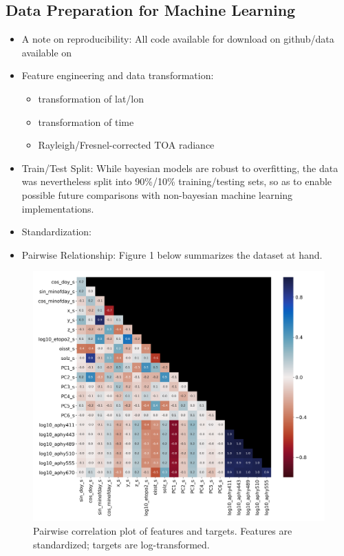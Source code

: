 \documentclass[10pt,a4paper]{article}
\begin{document}
		\subsection{Data Preparation for Machine Learning}
			\begin{itemize}
			    \item A note on reproducibility: All code available for download on github/data available on  
				\item Feature engineering and data transformation:
				\begin{itemize}
				    \item transformation of lat/lon
				    \item transformation of time
				    \item Rayleigh/Fresnel-corrected TOA radiance 
				\end{itemize}   
				\item Train/Test Split: While bayesian models are robust to overfitting, the data was nevertheless split into 90\%/10\% training/testing sets, so as to enable possible future comparisons with non-bayesian machine learning implementations. 
				\item Standardization: 
				\item Pairwise Relationship: Figure 1 below summarizes the dataset at hand.
			\end{itemize}
			\begin{figure}[H]
				\centering
				\includegraphics[scale=0.5]{feature_heatmap_annotated.png}
				\caption{Pairwise correlation plot of features and targets. Features are standardized; targets are log-transformed.}
			\end{figure}
\end{document}
